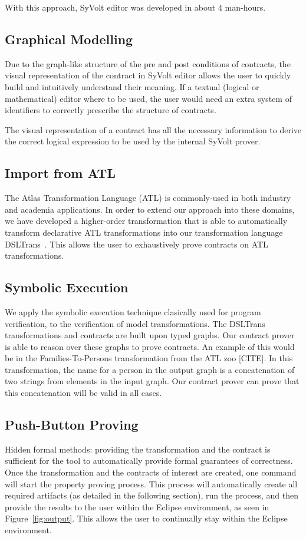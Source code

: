 With this approach, SyVolt editor was developed in about 4 man-hours.

\subsection{Graphical Modelling}

Due to the graph-like structure of the pre and post conditions of contracts, the
visual representation of the contract in SyVolt editor allows the user to
quickly build and intuitively understand their meaning.
If a textual (logical or mathematical) editor where to be used, the user would
need an extra system of identifiers to correctly prescribe the structure of contracts.

The visual representation of a contract has all the necessary information to derive the correct 
logical expression to be used by the internal SyVolt prover.

\subsection{Import from ATL}
The Atlas Transformation Language (ATL) is commonly-used in both industry and
academia applications. In order to extend our approach into these domains, we
have developed a higher-order transformation that is able to automatically
transform declarative ATL transformations into our transformation language
DSLTrans~\cite{Oakes}. This allows the user to exhaustively prove contracts on
ATL transformations.

\subsection{Symbolic Execution}
We apply the symbolic execution technique clasically used for program
verification, to the verification of model transformations. The DSLTrans
transformations and contracts are built upon typed graphs.
Our contract prover is able to reason over these graphs to prove contracts. An
example of this would be in the Families-To-Persons transformation from the ATL
zoo [CITE]. In this transformation, the name for a person in the output graph is
a concatenation of two strings from elements in the input graph. Our contract
prover can prove that this concatenation will be valid in all cases.

\subsection{Push-Button Proving}
Hidden formal methods: providing the transformation and the contract is
sufficient for the tool to automatically provide formal guarantees of correctness. Once the transformation
and the contracts of interest are created, one command will start the property proving process. This process will automatically create
all required artifacts (as detailed in the following section), run the process,
and then provide the results to the user within the Eclipse environment, as seen
in Figure~\ref{fig:output}. This allows the user to continually stay within the
Eclipse environment.

